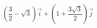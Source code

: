 \begin{displaymath}
 \left( \frac{3}{2}-\sqrt{3}\right)\overrightarrow i  + \left( 1+\frac{3\sqrt{3}}{2}\right)\overrightarrow j 
\end{displaymath}
